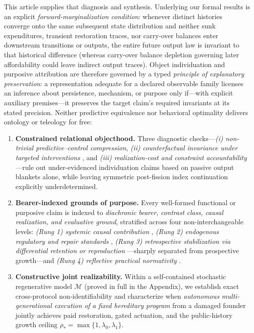 \documentclass[11pt,a4paper]{article}
\providecommand{\tightlist}{\setlength{\itemsep}{2pt}\setlength{\parskip}{0pt}}
\begin{document}
This article supplies that diagnosis and synthesis. Underlying our
formal results is an explicit \emph{forward-marginalization condition}:
whenever distinct histories converge onto the same subsequent state
distribution and neither sunk expenditures, transient restoration
traces, nor carry-over balances enter downstream transitions or outputs,
the entire future output law is invariant to that historical difference
(whereas carry-over balance depletion governing later affordability
could leave indirect output traces). Object individuation and purposive
attribution are therefore governed by a typed \emph{principle of
explanatory preservation}: a representation adequate for a declared
observable family licenses an inference about persistence, mechanism, or
purpose only if---with explicit auxiliary premises---it preserves the
target claim's required invariants at its stated precision. Neither
predictive equivalence nor behavioral optimality delivers ontology or
teleology for free:

\begin{enumerate}
\def\labelenumi{\arabic{enumi}.}
\tightlist
\item
  \textbf{Constrained relational objecthood.} Three diagnostic
  checks---\emph{(i) non-trivial predictive--control compression},
  \emph{(ii) counterfactual invariance under targeted interventions}
  \citep{hacking1983, woodward2003, craver2007}, and \emph{(iii)
  realization-cost and constraint accountability}
  \citep{jonas1966, rosen1991, montevilMossio2015}---rule out
  under-evidenced individuation claims based on passive output blankets
  alone, while leaving symmetric post-fission index continuation
  explicitly underdetermined.
\item
  \textbf{Bearer-indexed grounds of purpose.} Every well-formed
  functional or purposive claim is indexed to \emph{diachronic bearer,
  contrast class, causal realization, and evaluative ground}, stratified
  across four non-interchangeable levels: \emph{(Rung 1) systemic causal
  contribution} \citep{cummins1975}, \emph{(Rung 2) endogenous
  regulatory and repair standards}
  \citep{rosenblueth1943, mossio2009, diPaolo2005, bich2024},
  \emph{(Rung 3) retrospective stabilization via differential retention
  or reproduction}
  \citep{wright1973, millikan1984, godfreySmith1994, garson2019}---sharply
  separated from prospective growth---and \emph{(Rung 4) reflective
  practical normativity} \citep{korsgaard1996, scanlon1998, street2006}.
\item
  \textbf{Constructive joint realizability.} Within a self-contained
  stochastic regenerative model \(\mathcal{M}\) (proved in full in the
  Appendix), we establish exact cross-protocol non-identifiability and
  characterize when \emph{autonomous multi-generational execution of a
  fixed hereditary program} from a damaged founder jointly achieves paid
  restoration, gated actuation, and the public-history growth ceiling
  \(\rho_* = \max\{1, \lambda_0, \lambda_1\}\).
\end{enumerate}
\end{document}
